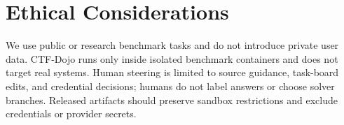 
\section{Ethical Considerations}
\label{sec:ethics}

We use public or research benchmark tasks and do not introduce private user data. CTF-Dojo runs only inside isolated benchmark containers and does not target real systems. Human steering is limited to source guidance, task-board edits, and credential decisions; humans do not label answers or choose solver branches. Released artifacts should preserve sandbox restrictions and exclude credentials or provider secrets.
